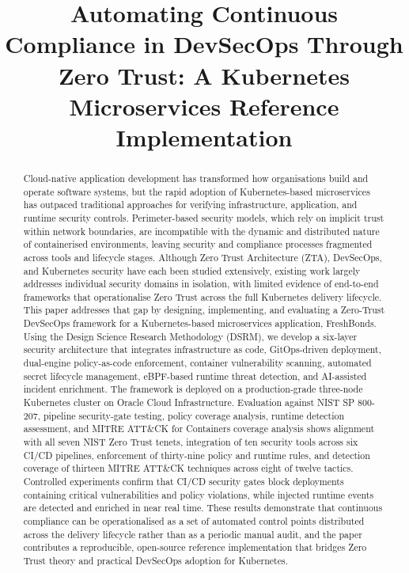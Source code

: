 \documentclass[conference]{IEEEtran}
\begin{document}
\title{Automating Continuous Compliance in DevSecOps Through Zero Trust: A Kubernetes Microservices Reference Implementation}

\author{
}

\maketitle

\begin{abstract}
Cloud-native application development has transformed how organisations build and operate software systems, but the rapid adoption of Kubernetes-based microservices has outpaced traditional approaches for verifying infrastructure, application, and runtime security controls. Perimeter-based security models, which rely on implicit trust within network boundaries, are incompatible with the dynamic and distributed nature of containerised environments, leaving security and compliance processes fragmented across tools and lifecycle stages. Although Zero Trust Architecture (ZTA), DevSecOps, and Kubernetes security have each been studied extensively, existing work largely addresses individual security domains in isolation, with limited evidence of end-to-end frameworks that operationalise Zero Trust across the full Kubernetes delivery lifecycle. This paper addresses that gap by designing, implementing, and evaluating a Zero-Trust DevSecOps framework for a Kubernetes-based microservices application, FreshBonds. Using the Design Science Research Methodology (DSRM), we develop a six-layer security architecture that integrates infrastructure as code, GitOps-driven deployment, dual-engine policy-as-code enforcement, container vulnerability scanning, automated secret lifecycle management, eBPF-based runtime threat detection, and AI-assisted incident enrichment. The framework is deployed on a production-grade three-node Kubernetes cluster on Oracle Cloud Infrastructure. Evaluation against NIST SP 800-207, pipeline security-gate testing, policy coverage analysis, runtime detection assessment, and MITRE ATT\&CK for Containers coverage analysis shows alignment with all seven NIST Zero Trust tenets, integration of ten security tools across six CI/CD pipelines, enforcement of thirty-nine policy and runtime rules, and detection coverage of thirteen MITRE ATT\&CK techniques across eight of twelve tactics. Controlled experiments confirm that CI/CD security gates block deployments containing critical vulnerabilities and policy violations, while injected runtime events are detected and enriched in near real time. These results demonstrate that continuous compliance can be operationalised as a set of automated control points distributed across the delivery lifecycle rather than as a periodic manual audit, and the paper contributes a reproducible, open-source reference implementation that bridges Zero Trust theory and practical DevSecOps adoption for Kubernetes.
\end{abstract}
\end{document}
